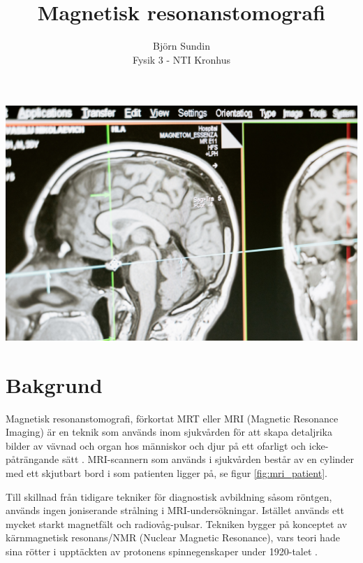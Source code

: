 \documentclass[11pt, a4paper]{article}
\title{Magnetisk resonanstomografi}
\author{Björn Sundin\medskip\\\normalsize Fysik 3 - NTI Kronhus}
\begin{document}
\maketitle
\vfill
\includegraphics[width=\textwidth]{mri_scan.jpg}
\vspace{1cm}
\vfill

\clearpage
\section{Bakgrund}

Magnetisk resonanstomografi, förkortat MRT eller MRI (Magnetic Resonance Imaging) är en teknik som används inom sjukvården för att skapa detaljrika bilder av vävnad och organ hos människor och djur på ett ofarligt och icke-påträngande sätt \parencite{mri_nobelpris_pressmeddelande}. MRI-scannern som används i sjukvården består av en cylinder med ett skjutbart bord i som patienten ligger på, se figur \ref{fig:mri_patient}. 

Till skillnad från tidigare tekniker för diagnostisk avbildning såsom röntgen, används ingen joniserande strålning i MRI-undersökningar. Istället används ett mycket starkt magnetfält och radiovåg-pulsar. Tekniken bygger på konceptet av kärnmagnetisk resonans/NMR (Nuclear Magnetic Resonance), vars teori hade sina rötter i upptäckten av protonens spinnegenskaper under 1920-talet \parencite{mri_lärobok}.
\end{document}

